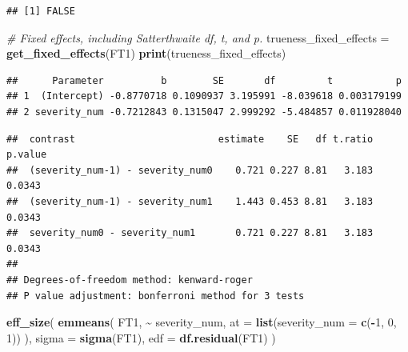 \documentclass[
]{article}
\newenvironment{Shaded}{\begin{snugshade}}{\end{snugshade}}
\newcommand{\AttributeTok}[1]{\textcolor[rgb]{0.13,0.29,0.53}{#1}}
\newcommand{\CommentTok}[1]{\textcolor[rgb]{0.56,0.35,0.01}{\textit{#1}}}
\newcommand{\DecValTok}[1]{\textcolor[rgb]{0.00,0.00,0.81}{#1}}
\newcommand{\FunctionTok}[1]{\textcolor[rgb]{0.13,0.29,0.53}{\textbf{#1}}}
\newcommand{\NormalTok}[1]{#1}
\newcommand{\OtherTok}[1]{\textcolor[rgb]{0.56,0.35,0.01}{#1}}
\newcommand{\SpecialCharTok}[1]{\textcolor[rgb]{0.81,0.36,0.00}{\textbf{#1}}}
\newcommand{\StringTok}[1]{\textcolor[rgb]{0.31,0.60,0.02}{#1}}
\begin{document}
\begin{verbatim}
## [1] FALSE
\end{verbatim}

\begin{Shaded}
\begin{Highlighting}[]
\CommentTok{\# Fixed effects, including Satterthwaite df, t, and p.}
\NormalTok{trueness\_fixed\_effects }\OtherTok{=} \FunctionTok{get\_fixed\_effects}\NormalTok{(FT1)}
\FunctionTok{print}\NormalTok{(trueness\_fixed\_effects)}
\end{Highlighting}
\end{Shaded}

\begin{verbatim}
##      Parameter          b        SE       df         t           p
## 1  (Intercept) -0.8770718 0.1090937 3.195991 -8.039618 0.003179199
## 2 severity_num -0.7212843 0.1315047 2.999292 -5.484857 0.011928040
\end{verbatim}

\begin{Shaded}
\end{Shaded}

\begin{verbatim}
##  contrast                         estimate    SE   df t.ratio p.value
##  (severity_num-1) - severity_num0    0.721 0.227 8.81   3.183  0.0343
##  (severity_num-1) - severity_num1    1.443 0.453 8.81   3.183  0.0343
##  severity_num0 - severity_num1       0.721 0.227 8.81   3.183  0.0343
## 
## Degrees-of-freedom method: kenward-roger 
## P value adjustment: bonferroni method for 3 tests
\end{verbatim}

\begin{Shaded}
\begin{Highlighting}[]
\FunctionTok{eff\_size}\NormalTok{(}
  \FunctionTok{emmeans}\NormalTok{(}
\NormalTok{    FT1,}
    \SpecialCharTok{\textasciitilde{}}\NormalTok{ severity\_num,}
    \AttributeTok{at =} \FunctionTok{list}\NormalTok{(}\AttributeTok{severity\_num =} \FunctionTok{c}\NormalTok{(}\SpecialCharTok{{-}}\DecValTok{1}\NormalTok{, }\DecValTok{0}\NormalTok{, }\DecValTok{1}\NormalTok{))}
\NormalTok{  ),}
  \AttributeTok{sigma =} \FunctionTok{sigma}\NormalTok{(FT1),}
  \AttributeTok{edf =} \FunctionTok{df.residual}\NormalTok{(FT1)}
\NormalTok{)}
\end{Highlighting}
\end{Shaded}
\end{document}
